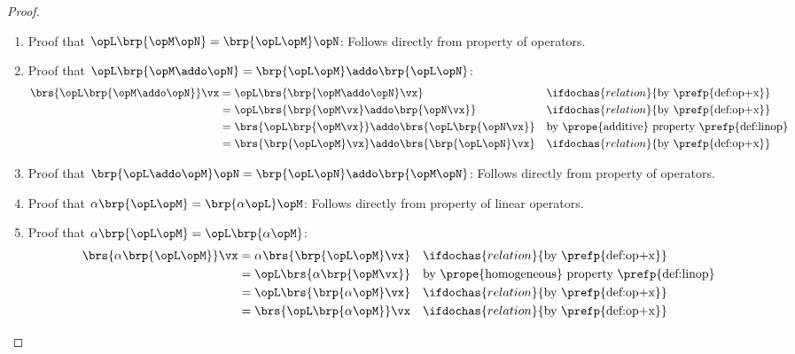 \begin{proof}
\begin{enumerate}
  \item Proof that $\opL\brp{\opM\opN}      = \brp{\opL\opM}\opN$: Follows directly from property of  operators.

  \item Proof that $\opL\brp{\opM\addo\opN} = \brp{\opL\opM}\addo\brp{\opL\opN}$:  
    \begin{align*}
      \brs{\opL\brp{\opM\addo\opN}}\vx
        &= \opL\brs{\brp{\opM\addo\opN}\vx} 
        && \ifdochas{relation}{\text{by \prefp{def:op+x}}}
      \\&= \opL\brs{\brp{\opM\vx}\addo\brp{\opN\vx}} 
        && \ifdochas{relation}{\text{by \prefp{def:op+x}}}
      \\&= \brs{\opL\brp{\opM\vx}} \addo \brs{\opL\brp{\opN\vx}}
        && \text{by \prope{additive} property \prefp{def:linop}}
      \\&= \brs{\brp{\opL\opM}\vx}\addo\brs{\brp{\opL\opN}\vx}
        && \ifdochas{relation}{\text{by \prefp{def:op+x}}}
    \end{align*}

  \item Proof that $\brp{\opL\addo\opM}\opN = \brp{\opL\opN}\addo\brp{\opM\opN}$:  Follows directly from property of  operators.

  \item Proof that $\alpha\brp{\opL\opM} = \brp{\alpha\opL}\opM$: Follows directly from  property of linear operators.
  \item Proof that $\alpha\brp{\opL\opM} = \opL\brp{\alpha\opM}$:
    \begin{align*}
      \brs{\alpha\brp{\opL\opM}}\vx
        &= \alpha\brs{\brp{\opL\opM}\vx}
        && \ifdochas{relation}{\text{by \prefp{def:op+x}}}
      \\&= \opL\brs{\alpha\brp{\opM\vx}}
        && \text{by \prope{homogeneous} property \prefp{def:linop}}
      \\&= \opL\brs{\brp{\alpha\opM}\vx}
        && \ifdochas{relation}{\text{by \prefp{def:op+x}}}
      \\&= \brs{\opL\brp{\alpha\opM}}\vx
        && \ifdochas{relation}{\text{by \prefp{def:op+x}}}
    \end{align*}
\end{enumerate}
\end{proof}
  
